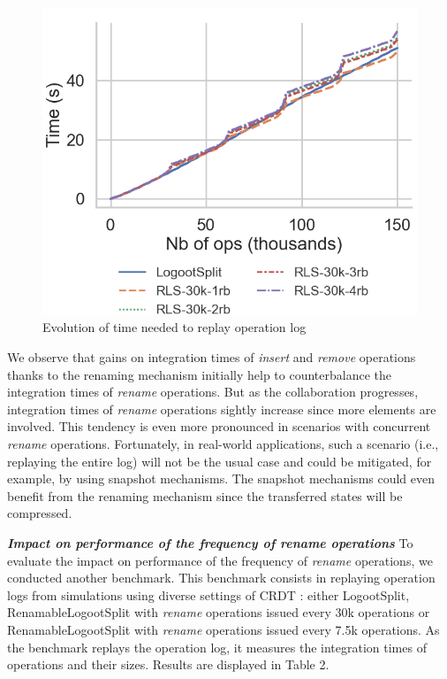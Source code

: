 \documentclass[10pt,journal,compsoc]{IEEEtran}
\let\MYoriglatexcaption\caption
\renewcommand{\caption}[2][\relax]{\MYoriglatexcaption[#2]{#2}}
\newcommand{\headerparagraph}[1]{\textbf{\emph{#1}}\quad}
\begin{document}
\begin{figure}[!ht]
    \centering
    \includegraphics[width=0.7\columnwidth]{img/replay-log-30k-with-legend.png}
    \caption{Evolution of time needed to replay operation log}
    \label{fig:time-to-replay-log}
\end{figure}

We observe that gains on integration times of \emph{insert} and \emph{remove} operations thanks to the renaming mechanism initially help to counterbalance the integration times of \emph{rename} operations.
But as the collaboration progresses, integration times of \emph{rename} operations sightly increase since more elements are involved.
This tendency is even more pronounced in scenarios with concurrent \emph{rename} operations.
Fortunately, in real-world applications, such a scenario (i.e., replaying the entire log) will not be the usual case and could be mitigated, for example, by using snapshot mechanisms.
The snapshot mechanisms could even benefit from the renaming mechanism since the transferred states will be compressed.

\headerparagraph{Impact on performance of the frequency of \emph{rename} operations}
%
To evaluate the impact on performance of the frequency of \emph{rename} operations, we conducted another benchmark.
This benchmark consists in replaying operation logs from simulations using diverse settings of \ac{CRDT} : either LogootSplit, RenamableLogootSplit with \emph{rename} operations issued every 30k operations or RenamableLogootSplit with \emph{rename} operations issued every 7.5k operations.
As the benchmark replays the operation log, it measures the integration times of operations and their sizes.
Results are displayed in Table 2.
\end{document}
